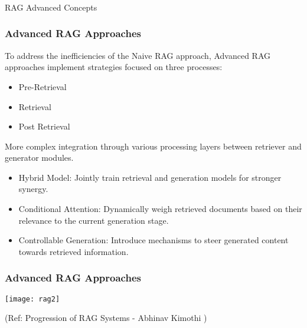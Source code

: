 \begin{frame}[fragile]\frametitle{}
\begin{center}
{\Large RAG Advanced Concepts}
\end{center}
\end{frame}


\begin{frame}[fragile]\frametitle{Advanced RAG Approaches}

To  address  the  inefficiencies  of  the  Naive  RAG  approach,  Advanced  RAG
approaches implement strategies focused on three processes:
\begin{itemize}
\item Pre-Retrieval
\item Retrieval
\item Post Retrieval
\end{itemize}	

More complex integration through various processing layers between retriever and generator modules.

\begin{itemize}
\item Hybrid Model: Jointly train retrieval and generation models for stronger synergy.
\item Conditional Attention: Dynamically weigh retrieved documents based on their relevance to the current generation stage.
\item Controllable Generation: Introduce mechanisms to steer generated content towards retrieved information.
\end{itemize}	

\end{frame}

\begin{frame}[fragile]\frametitle{Advanced RAG Approaches}

\begin{center}
\texttt{[image: rag2]}

{\tiny (Ref: Progression of RAG Systems - Abhinav Kimothi )}
\end{center}	
\end{frame}


